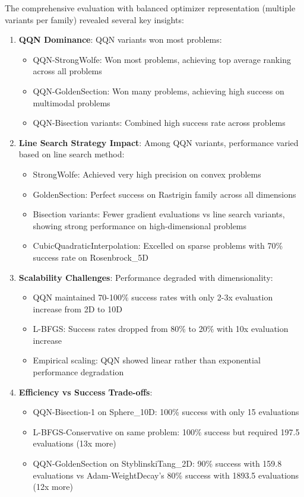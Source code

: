 The comprehensive evaluation with balanced optimizer representation (multiple variants per family) revealed several key insights:

\begin{enumerate}
\def\labelenumi{\arabic{enumi}.}
\tightlist
\item
  \textbf{QQN Dominance}: QQN variants won most problems:

  \begin{itemize}
  \tightlist
  \item
    QQN-StrongWolfe: Won most problems, achieving top average ranking across all problems
  \item
    QQN-GoldenSection: Won many problems, achieving high success on multimodal problems
  \item
    QQN-Bisection variants: Combined high success rate across problems
  \end{itemize}
\item
  \textbf{Line Search Strategy Impact}: Among QQN variants, performance varied based on line search method:

  \begin{itemize}
  \tightlist
  \item
    StrongWolfe: Achieved very high precision on convex problems
  \item
    GoldenSection: Perfect success on Rastrigin family across all dimensions
  \item
    Bisection variants: Fewer gradient evaluations vs line search variants, showing strong performance on high-dimensional problems
  \item
    CubicQuadraticInterpolation: Excelled on sparse problems with 70\% success rate on Rosenbrock\_5D
  \end{itemize}
\item
  \textbf{Scalability Challenges}: Performance degraded with dimensionality:

  \begin{itemize}
  \tightlist
  \item
    QQN maintained 70-100\% success rates with only 2-3x evaluation increase from 2D to 10D
  \item
    L-BFGS: Success rates dropped from 80\% to 20\% with 10x evaluation increase
  \item
    Empirical scaling: QQN showed linear rather than exponential performance degradation
  \end{itemize}
\item
  \textbf{Efficiency vs Success Trade-offs}:

  \begin{itemize}
  \tightlist
  \item
    QQN-Bisection-1 on Sphere\_10D: 100\% success with only 15 evaluations
  \item
    L-BFGS-Conservative on same problem: 100\% success but required 197.5 evaluations (13x more)
  \item
    QQN-GoldenSection on StyblinskiTang\_2D: 90\% success with 159.8 evaluations vs Adam-WeightDecay's 80\% success with 1893.5 evaluations (12x more)
  \end{itemize}
\end{enumerate}

